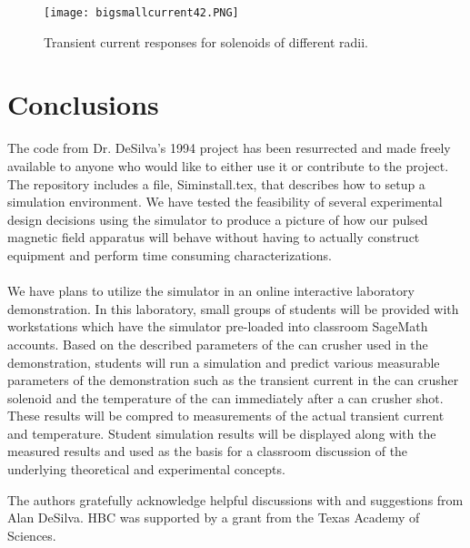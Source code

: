 \documentclass[prb,preprint]{revtex4-1}
\begin{document}
\begin{figure}[h!]
\centering
\texttt{[image: bigsmallcurrent42.PNG]}
\caption{Transient current responses for solenoids of different radii.}
\label{sunsets}
\end{figure}
\section{Conclusions}
The code from Dr. DeSilva's 1994 project has been resurrected and made freely available to anyone who would like to either use it or contribute to the project\cite{gitSim}.  The repository includes a file, Siminstall.tex, that describes how to setup a simulation environment.  We have tested the feasibility of several experimental design decisions using the simulator to produce a picture of how our pulsed magnetic field apparatus will behave without having to actually construct equipment and perform time consuming characterizations.
\\
\\
We have plans to utilize the simulator in an online interactive laboratory demonstration\cite{ILD}.  In this laboratory, small groups of students will be provided with workstations which have the simulator pre-loaded into classroom SageMath accounts.  Based on the described parameters of the can crusher used in the demonstration, students will run a simulation and predict various measurable parameters of the demonstration such as the transient current in the can crusher solenoid and the temperature of the can immediately after a can crusher shot.  These results will be compred to measurements of the actual transient current and temperature.  Student simulation results will be displayed along with the measured results and used as the basis for a classroom discussion of the underlying theoretical and experimental concepts.

\begin{acknowledgments}
The authors gratefully acknowledge helpful discussions with and suggestions from Alan DeSilva.  HBC was supported by a grant from the Texas Academy of Sciences.\end{acknowledgments}
\end{document}
